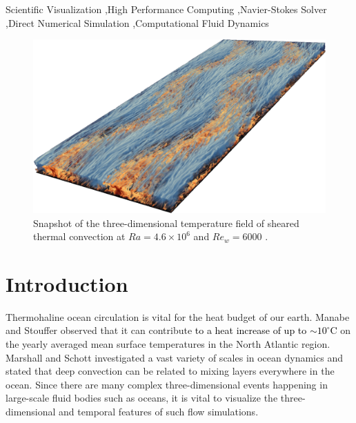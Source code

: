 \documentclass[5p,times]{elsarticle}
\begin{document}
\begin{frontmatter}
\begin{abstract}
\end{abstract}

\begin{keyword}

Scientific Visualization \sep High Performance Computing \sep Navier-Stokes Solver \sep Direct Numerical Simulation \sep Computational Fluid Dynamics

\end{keyword}

\end{frontmatter}


\begin{figure}[!hbt]
	\centering
	\includegraphics[width=\linewidth]{flowfield}%
	\caption{\label{fig:flowfield} Snapshot of the three-dimensional temperature field of sheared thermal convection at $ Ra=4.6 \times 10^6 $ and $ Re_w=6000 $ \cite{bla19}.}
\end{figure}

\section{Introduction}
\label{sec:Introduction}

Thermohaline ocean circulation \cite{rah00} is vital for the heat budget of our earth. Manabe and Stouffer \cite{man88} observed that it can contribute \textcolor{black}{to a heat increase of up to $ \sim 10 ^ \circ $C} on the yearly averaged mean surface temperatures in the North Atlantic region. Marshall and Schott \cite{mar99} investigated a vast variety of scales in ocean dynamics and stated that deep convection can be related to mixing layers everywhere in the ocean. Since there are many complex three-dimensional events happening in large-scale fluid bodies such as oceans, it is vital to visualize the three-dimensional and temporal features of such flow simulations.
\end{document}
